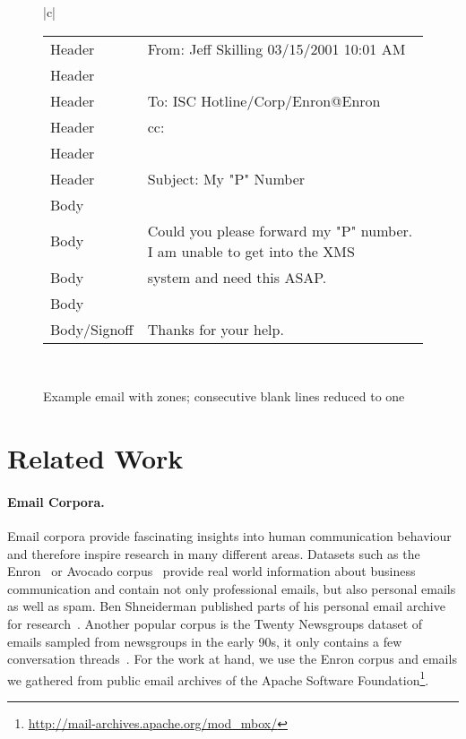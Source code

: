 \documentclass{llncs}
\begin{document}
\begin{figure}[tb]
\begin{tabular}{|c|}
{\begin{tabular*}{\textwidth}{l|l}
		Header         & From:  Jeff Skilling                           03/15/2001 10:01 AM \\
		Header         & \\
		Header         & To: ISC Hotline/Corp/Enron@Enron\\
		Header         & cc:\\
		Header         & \\
		Header         & Subject: My "P" Number\\\hline
		Body           & \\
		Body           & Could you please forward my "P" number.  I am unable to get into the XMS \\
		Body           & system and need this ASAP.\\
		Body           & \\
		Body/Signoff   & Thanks for your help.\\
	\end{tabular*}
}
	\\ 
	\hline 
\end{tabular} 
\caption{Example email with zones; consecutive blank lines reduced to one}
\label{fig:examplemail}
\end{figure}





\section{Related Work}
\paragraph{Email Corpora.}
Email corpora provide fascinating insights into human communication behaviour and therefore inspire research in many different areas.
Datasets such as the Enron~\cite{enron} or Avocado corpus~\cite{avocado} provide real world information about business communication and contain not only professional emails, but also personal emails as well as spam.
Ben Shneiderman published parts of his personal email archive for research~\cite{shneiderman}.
Another popular corpus is the Twenty Newsgroups dataset of emails sampled from newsgroups in the early 90s, it only contains a few conversation threads~\cite{20news}.
For the work at hand, we use the Enron corpus and emails we gathered from public email archives of the Apache Software Foundation\footnote{\url{http://mail-archives.apache.org/mod\_mbox/}}.
\end{document}
